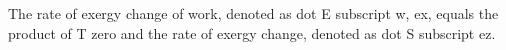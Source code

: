 The rate of exergy change of work, denoted as dot E subscript w, ex, equals the product of T zero and the rate of exergy change, denoted as dot S subscript ez.